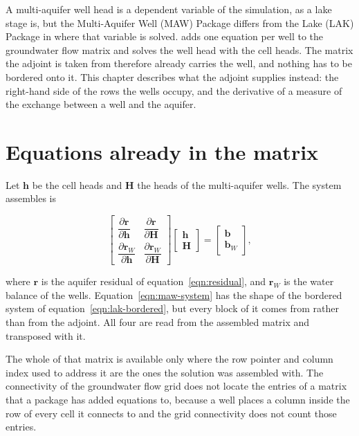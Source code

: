 A multi-aquifer well head is a dependent variable of the simulation, as a lake stage is, but the Multi-Aquifer Well (MAW) Package differs from the Lake (LAK) Package in where that variable is solved. \mf{} adds one equation per well to the groundwater flow matrix and solves the well head with the cell heads. The matrix the adjoint is taken from therefore already carries the well, and nothing has to be bordered onto it. This chapter describes what the adjoint supplies instead: the right-hand side of the rows the wells occupy, and the derivative of a measure of the exchange between a well and the aquifer.

\section*{Equations already in the matrix}

Let $\mathbf{h}$ be the cell heads and $\mathbf{H}$ the heads of the multi-aquifer wells. The system \mf{} assembles is

\begin{equation}
	\label{eqn:maw-system}
	\begin{bmatrix}
		\dfrac{\partial \mathbf{r}}{\partial \mathbf{h}} &
		\dfrac{\partial \mathbf{r}}{\partial \mathbf{H}} \\[2ex]
		\dfrac{\partial \mathbf{r}_{W}}{\partial \mathbf{h}} &
		\dfrac{\partial \mathbf{r}_{W}}{\partial \mathbf{H}}
	\end{bmatrix}
	\begin{bmatrix} \mathbf{h} \\ \mathbf{H} \end{bmatrix}
	=
	\begin{bmatrix} \mathbf{b} \\ \mathbf{b}_{W} \end{bmatrix},
\end{equation}

\noindent where $\mathbf{r}$ is the aquifer residual of equation~\ref{eqn:residual}, and $\mathbf{r}_{W}$ is the water balance of the wells. Equation~\ref{eqn:maw-system} has the shape of the bordered system of equation~\ref{eqn:lak-bordered}, but every block of it comes from \mf{} rather than from the adjoint. All four are read from the assembled matrix and transposed with it.

The whole of that matrix is available only where the row pointer and column index used to address it are the ones the solution was assembled with. The connectivity of the groundwater flow grid does not locate the entries of a matrix that a package has added equations to, because a well places a column inside the row of every cell it connects to and the grid connectivity does not count those entries.

